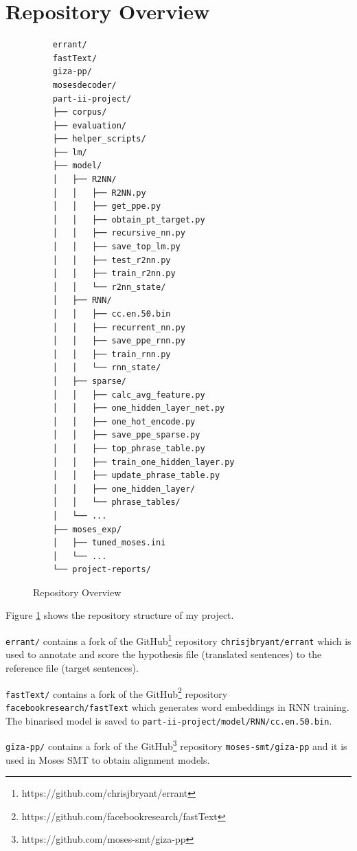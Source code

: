 \documentclass[12pt,a4paper,twoside,openright]{report}
\begin{document}
\section{Repository Overview}
\begin{figure}[ht]
    \begin{verbatim}
    errant/
    fastText/
    giza-pp/
    mosesdecoder/
    part-ii-project/
    ├── corpus/
    ├── evaluation/
    ├── helper_scripts/
    ├── lm/
    ├── model/
    │   ├── R2NN/
    │   │   ├── R2NN.py
    │   │   ├── get_ppe.py
    │   │   ├── obtain_pt_target.py
    │   │   ├── recursive_nn.py
    │   │   ├── save_top_lm.py
    │   │   ├── test_r2nn.py
    │   │   ├── train_r2nn.py
    │   │   └── r2nn_state/
    │   ├── RNN/
    │   │   ├── cc.en.50.bin
    │   │   ├── recurrent_nn.py
    │   │   ├── save_ppe_rnn.py
    │   │   ├── train_rnn.py
    │   │   └── rnn_state/
    │   ├── sparse/
    │   │   ├── calc_avg_feature.py
    │   │   ├── one_hidden_layer_net.py
    │   │   ├── one_hot_encode.py
    │   │   ├── save_ppe_sparse.py
    │   │   ├── top_phrase_table.py
    │   │   ├── train_one_hidden_layer.py
    │   │   ├── update_phrase_table.py
    │   │   ├── one_hidden_layer/
    │   │   └── phrase_tables/
    │   └── ...
    ├── moses_exp/
    │   ├── tuned_moses.ini
    │   └── ...
    └── project-reports/
    \end{verbatim}
    \caption{Repository Overview}
    \label{fig:repo}
\end{figure}

Figure \ref{fig:repo} shows the repository structure of my project. 

\texttt{errant/} contains a fork of the GitHub\footnote{https://github.com/chrisjbryant/errant} repository \texttt{chrisjbryant/errant}\cite{bryant-etal-2017-automatic}\cite{felice-etal-2016-automatic} which is used to annotate and score the hypothesis file (translated sentences) to the reference file (target sentences). 

\texttt{fastText/} contains a fork of the GitHub\footnote{https://github.com/facebookresearch/fastText} repository \texttt{facebookresearch/fastText}\cite{grave2018learning} which generates word embeddings in RNN training. The binarised model is saved to \texttt{part-ii-project/model/RNN/cc.en.50.bin}.

\texttt{giza-pp/} contains a fork of the GitHub\footnote{https://github.com/moses-smt/giza-pp} repository \texttt{moses-smt/giza-pp}\cite{giza_pp} and it is used in Moses SMT to obtain alignment models.
\end{document}
